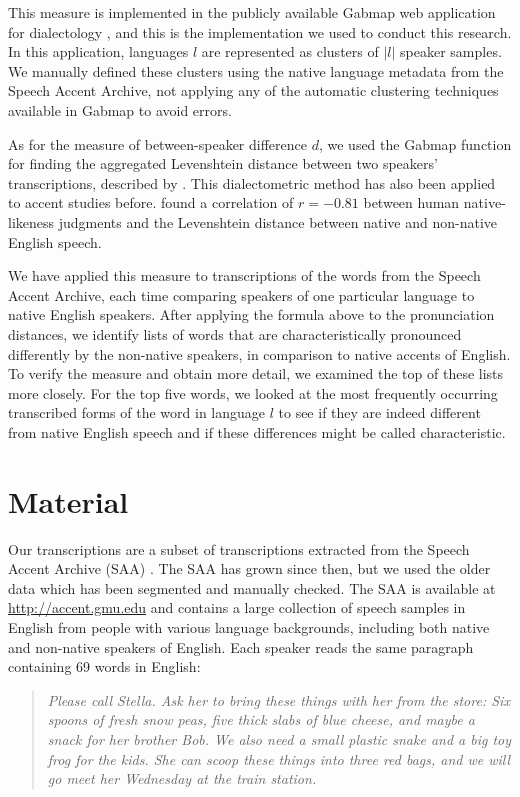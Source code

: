 \documentclass[output=paper]{LSP/langsci}
\begin{document}
This measure is implemented in the publicly available Gabmap web application for dialectology \citep{nerbonne_gabmap_2011}, and this is the implementation we used to conduct this research. In this application, languages $l$ are represented as clusters of $|l|$ speaker samples. We manually defined these clusters using the native language metadata from the Speech Accent Archive, not applying any of the automatic clustering techniques available in Gabmap to avoid errors.

As for the measure of between-speaker difference $d$, we used the Gabmap function for finding the aggregated Levenshtein distance between two speakers' transcriptions, described by \citet{nerbonne_gabmap_2011}. This dialectometric method has also been applied to accent studies before. \citet{wieling_measuring_2014} found a correlation of $r = -0.81$ between human native-likeness judgments and the Levenshtein distance between native and non-native English speech.   

We have applied this measure to transcriptions of the words from the Speech Accent Archive, each time comparing speakers of one particular language to native English speakers. After applying the formula above to the pronunciation distances, we identify lists of words that are characteristically pronounced differently by the non-native speakers, in comparison to native accents of English. To verify the measure and obtain more detail, we examined the top of these lists more closely. For the top five words, we looked at the most frequently occurring transcribed forms of the word in language $l$ to see if they are indeed different from native English speech and if these differences might be called characteristic.

\section{Material}
\label{s:material}

Our transcriptions are a subset of transcriptions extracted from the Speech Accent Archive (SAA) \citep{weinberger_speech_2011}. The SAA has grown since then, but we used the older data which has been segmented and manually checked. The SAA is available at \url{http://accent.gmu.edu} and contains a large collection of speech samples in English from people with various language backgrounds, including both native and non-native speakers of English. Each speaker reads the same paragraph containing 69 words in English:

\begin{quote}
\textit{Please call Stella. Ask her to bring these things with her from the store: Six spoons of fresh snow peas, five thick slabs of blue cheese, and maybe a snack for her brother Bob. We also need a small plastic snake and a big toy frog for the kids. She can scoop these things into three red bags, and we will go meet her Wednesday at the train station.}
\end{quote}
\end{document}

